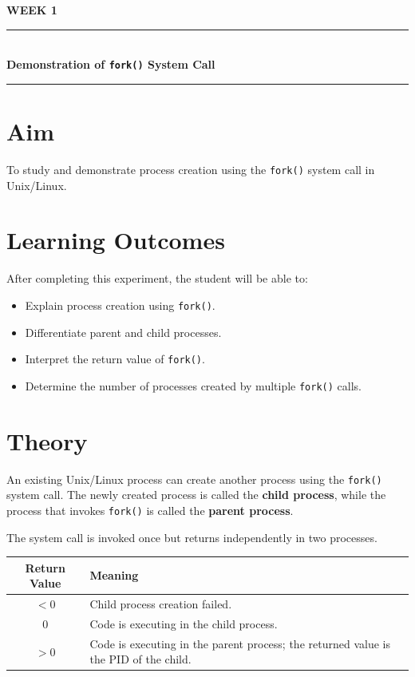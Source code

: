 \documentclass[12pt,a4paper]{report}
\newcommand{\experimenttitle}[2]{
\clearpage
\begin{center}
{\Large\bfseries\color{univblue} WEEK #1}\\[0.15cm]
\rule{\textwidth}{1pt}\\[0.2cm]
{\LARGE\bfseries #2}\\[0.2cm]
\rule{\textwidth}{1pt}
\end{center}
\vspace{0.4cm}
}
\begin{document}

\experimenttitle{1}{Demonstration of \texttt{fork()} System Call}

\section*{Aim}

To study and demonstrate process creation using the \texttt{fork()} system call
in Unix/Linux.

\section*{Learning Outcomes}

After completing this experiment, the student will be able to:

\begin{itemize}
    \item Explain process creation using \texttt{fork()}.
    \item Differentiate parent and child processes.
    \item Interpret the return value of \texttt{fork()}.
    \item Determine the number of processes created by multiple
    \texttt{fork()} calls.
\end{itemize}

\section*{Theory}

An existing Unix/Linux process can create another process using the
\texttt{fork()} system call. The newly created process is called the
\textbf{child process}, while the process that invokes \texttt{fork()} is
called the \textbf{parent process}.

The system call is invoked once but returns independently in two processes.

\begin{center}
\begin{tabular}{|c|p{8cm}|}
\hline
\textbf{Return Value} & \textbf{Meaning} \\
\hline
$<0$ & Child process creation failed. \\
\hline
$0$ & Code is executing in the child process. \\
\hline
$>0$ & Code is executing in the parent process; the returned value is the
PID of the child. \\
\hline
\end{tabular}
\end{center}
\end{document}
